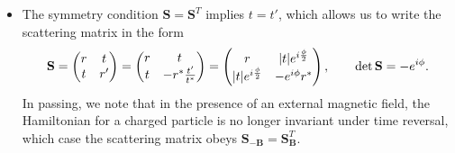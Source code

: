 \documentclass[11pt, a4paper]{article}
\newcommand{\Ham}{Hamiltonian\xspace}
\renewcommand{\vec}[1]{\bm{#1}}  %
\newcommand{\mat}[1]{\mathbf{#1}}  %
\renewcommand{\SS}{\mat{S}}  %
\newcommand{\B}{\vec{B}}  %
\begin{document}
\begin{itemize}
    \item The symmetry condition $ \SS = \SS^{T} $ implies $ t = t' $, which allows us to write the scattering matrix in the form
    \begin{equation*}
        \SS = 
        \begin{pmatrix}
            r & t\\
            t & r'
        \end{pmatrix}
        = 
        \begin{pmatrix}
            r & t\\
            t & - r^{*}\frac{t'}{t^{*}}
        \end{pmatrix}
        = 
        \begin{pmatrix}
            r & \abs{t}e^{i\frac{\phi}{2}}\\
            \abs{t}e^{i\frac{\phi}{2}} & - e^{i\phi}r^{*}
        \end{pmatrix}, \qquad \det \SS = -e^{i\phi}.
    \end{equation*}
    In passing, we note that in the presence of an external magnetic field, the \Ham for a charged particle is no longer invariant under time reversal, which case the scattering matrix obeys $ \SS_{-\B} = \SS_{\B}^{T} $.

\end{itemize}
\end{document}
